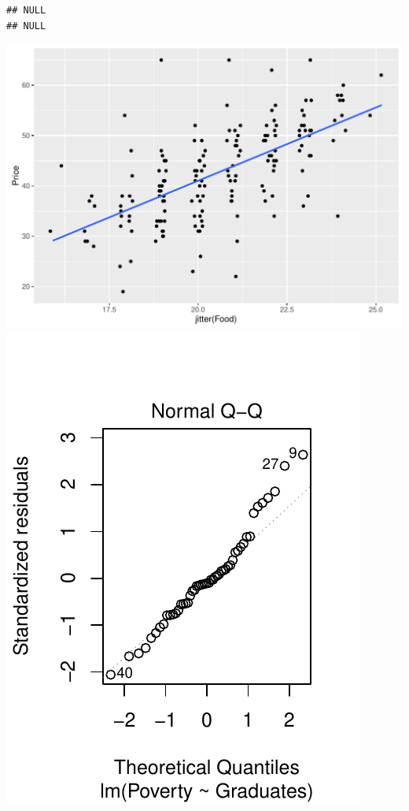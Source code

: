 \documentclass[10pt]{article}\usepackage[]{graphicx}\usepackage[]{color}
\makeatletter
\def\maxwidth{ %
  \ifdim\Gin@nat@width>\linewidth
    \linewidth
  \else
    \Gin@nat@width
  \fi
}
\newenvironment{kframe}{%
 \def\at@end@of@kframe{}%
 \ifinner\ifhmode%
  \def\at@end@of@kframe{\end{minipage}}%
  \begin{minipage}{\columnwidth}%
 \fi\fi%
 \def\FrameCommand##1{\hskip\@totalleftmargin \hskip-\fboxsep
 \colorbox{shadecolor}{##1}\hskip-\fboxsep
     \hskip-\linewidth \hskip-\@totalleftmargin \hskip\columnwidth}%
 \MakeFramed {\advance\hsize-\width
   \@totalleftmargin\z@ \linewidth\hsize
   \@setminipage}}%
 {\par\unskip\endMakeFramed%
 \at@end@of@kframe}
\newenvironment{knitrout}{}{} %
\makeatother
\begin{document}
\begin{knitrout}
\color{fgcolor}\begin{kframe}
\begin{verbatim}
## NULL
## NULL
\end{verbatim}
\end{kframe}
\includegraphics[width=\maxwidth]{figure/unnamed-chunk-4-1} 
\includegraphics[width=\maxwidth]{figure/unnamed-chunk-4-2} 

\end{knitrout}
\end{document}
